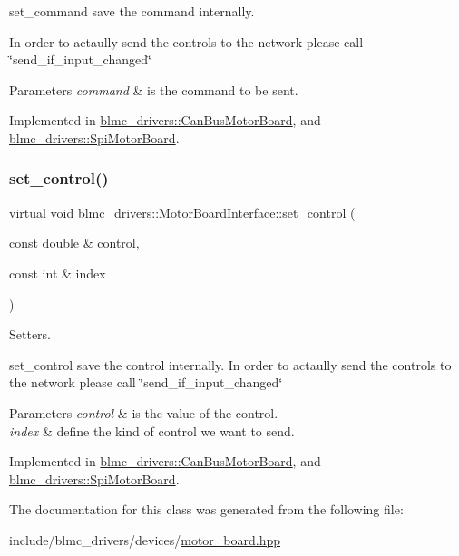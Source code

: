 set\+\_\+command save the command internally. 

In order to actaully send the controls to the network please call \char`\"{}send\+\_\+if\+\_\+input\+\_\+changed\char`\"{}


\begin{DoxyParams}{Parameters}
{\em command} & is the command to be sent. \\
\hline
\end{DoxyParams}


Implemented in \hyperlink{classblmc__drivers_1_1CanBusMotorBoard_a4bb9c1f7f59507feed145111ccffc625}{blmc\+\_\+drivers\+::\+Can\+Bus\+Motor\+Board}, and \hyperlink{classblmc__drivers_1_1SpiMotorBoard_a6b626225af993444bdee397952281772}{blmc\+\_\+drivers\+::\+Spi\+Motor\+Board}.

\mbox{\label{classblmc__drivers_1_1MotorBoardInterface_a3ace57ba3e09b9b3120d09303ff39a61}} 
\subsubsection{\texorpdfstring{set\+\_\+control()}{set\_control()}}
{\footnotesize\ttfamily virtual void blmc\+\_\+drivers\+::\+Motor\+Board\+Interface\+::set\+\_\+control (\begin{DoxyParamCaption}\item[{const double \&}]{control,  }\item[{const int \&}]{index }\end{DoxyParamCaption})\hspace{0.3cm}{\ttfamily [pure virtual]}}



Setters. 

set\+\_\+control save the control internally. In order to actaully send the controls to the network please call \char`\"{}send\+\_\+if\+\_\+input\+\_\+changed\char`\"{}


\begin{DoxyParams}{Parameters}
{\em control} & is the value of the control. \\
\hline
{\em index} & define the kind of control we want to send. \\
\hline
\end{DoxyParams}


Implemented in \hyperlink{classblmc__drivers_1_1CanBusMotorBoard_a8dbd787fcfc25d68d5443e2f0bf21f64}{blmc\+\_\+drivers\+::\+Can\+Bus\+Motor\+Board}, and \hyperlink{classblmc__drivers_1_1SpiMotorBoard_ae11c5382665adfa718bcc43ec1e84b6e}{blmc\+\_\+drivers\+::\+Spi\+Motor\+Board}.



The documentation for this class was generated from the following file\+:\begin{DoxyCompactItemize}
\item 
include/blmc\+\_\+drivers/devices/\hyperlink{motor__board_8hpp}{motor\+\_\+board.\+hpp}\end{DoxyCompactItemize}
